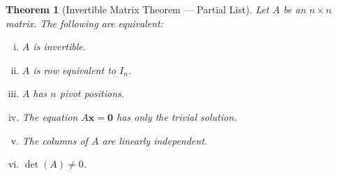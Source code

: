 \documentclass[11pt]{article}
\newtheorem{theorem}{Theorem}
\theoremstyle{definition}
\begin{document}
\begin{theorem}[Invertible Matrix Theorem --- Partial List]
Let $A$ be an $n \times n$ matrix. The following are equivalent:
\begin{enumerate}[(i)]
  \item $A$ is invertible.
  \item $A$ is row equivalent to $I_n$.
  \item $A$ has $n$ pivot positions.
  \item The equation $A\mathbf{x} = \mathbf{0}$ has only the trivial solution.
  \item The columns of $A$ are linearly independent.
  \item $\det(A) \neq 0$.
\end{enumerate}
\end{theorem}
\end{document}
